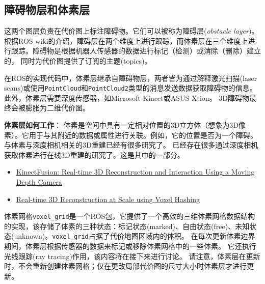 \subsection[obstacle layer and voxel layer]{障碍物层和体素层}
这两个图层负责在代价图上标注障碍物。它们可以被称为障碍层(\textit{obstacle layer})。根据ROS wiki的介绍，障碍层在两个维度上进行跟踪，而体素层在三个维度上进行跟踪。障碍物是根据机器人传感器的数据进行标记（检测）或清除（删除）建立的，
同时为代价图提供了订阅的主题(topics)。

在ROS的实现代码中，体素层继承自障碍物层，两者皆为通过解释激光扫描(laser scans)或使用\texttt{PointCloud}和\texttt{PointCloud2}类型的消息发送数据获取障碍物的信息。 此外，体素层需要深度传感器，如Microsoft Kinect或ASUS Xtion。 3D障碍物最终会被膨胀为二维代价图。

\textbf{体素层如何工作}：
体素是空间中具有一定相对位置的3D立方体（想象为3D像素）。它用于与其附近的数据或属性进行关联。例如，它的位置是否为一个障碍。
与体素与深度相机相关的3D重建已经有很多研究了。
已经存在很多通过深度相机获取体素进行在线3D重建的研究了。这是其中的一部分。

\begin{itemize}
	\item \href{http://delivery.acm.org/10.1145/2050000/2047270/p559-izadi.pdf?ip=128.208.7.188&id=2047270&acc=ACTIVE\%20SERVICE&key=B63ACEF81C6334F5\%2EF43F328D6C8418D0\%2E4D4702B0C3E38B35\%2E4D4702B0C3E38B35&CFID=830915711&CFTOKEN=23054788&__acm__=1472349664_9fd28ae246d72a507f6a93c5ac84a516}{KinectFusion: Real-time 3D Reconstruction and Interaction Using a Moving Depth Camera} 
	\item \href{https://people.mpi-inf.mpg.de/~mzollhoef/Papers/SGASIA2013_VH/paper.pdf}{Real-time 3D Reconstruction at Scale using Voxel Hashing}
\end{itemize}

体素网格\texttt{voxel_grid}是一个ROS包，它提供了一个高效的三维体素网格数据结构的实现，该存储了体素的三种状态：标记状态(marked)、自由状态(free)、未知状态(unknown)。\texttt{voxel_grid}占据了代价地图区域内的体积。
在每次更新体素边界期间，体素层根据传感器的数据来标记或移除体素网格中的一些体素。
它还执行光线跟踪(ray tracing)作用，该内容将在接下来进行讨论。
请注意，体素层在更新时，不会重新创建体素网格；仅在更改局部代价图的尺寸大小时体素层才进行更新。

